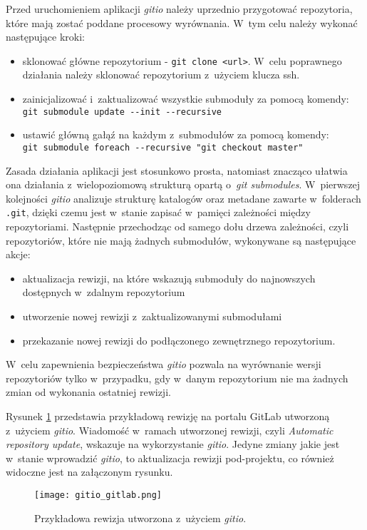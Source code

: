 Przed uruchomieniem aplikacji \emph{gitio} należy uprzednio przygotować repozytoria, które mają zostać poddane procesowy wyrównania. W~tym celu należy wykonać następujące kroki:
\begin{itemize}
    \item sklonować główne repozytorium - \lstinline{git clone <url>}. W~celu poprawnego działania należy sklonować repozytorium z~użyciem klucza ssh.
    \item zainicjalizować i~zaktualizować wszystkie submoduły za pomocą komendy: \\
        \lstinline{git submodule update --init --recursive}
    \item ustawić główną gałąź na każdym z~submodułów za pomocą komendy: \\
        \lstinline{git submodule foreach --recursive "git checkout master"}
\end{itemize}
Zasada działania aplikacji jest stosunkowo prosta, natomiast znacząco ułatwia ona działania z~wielopoziomową strukturą opartą o~\emph{git submodules}. W~pierwszej kolejności \emph{gitio} analizuje strukturę katalogów oraz metadane zawarte w~folderach \lstinline{.git}, dzięki czemu jest w~stanie zapisać w~pamięci zależności między repozytoriami. Następnie przechodząc od samego dołu drzewa zależności, czyli repozytoriów, które nie mają żadnych submodułów, wykonywane są następujące akcje:
\begin{itemize}
    \item aktualizacja rewizji, na które wskazują submoduły do najnowszych dostępnych w~zdalnym repozytorium
    \item utworzenie nowej rewizji z~zaktualizowanymi submodułami
    \item przekazanie nowej rewizji do podłączonego zewnętrznego repozytorium.
\end{itemize}
W~celu zapewnienia bezpieczeństwa \emph{gitio} pozwala na wyrównanie wersji repozytoriów tylko w~przypadku, gdy w~danym repozytorium nie ma żadnych zmian od wykonania ostatniej rewizji. 

Rysunek \ref{fig:gitlab_gitio} przedstawia przykładową rewizję na portalu GitLab utworzoną z~użyciem \emph{gitio}. Wiadomość w~ramach utworzonej rewizji, czyli \emph{Automatic repository update}, wskazuje na wykorzystanie \emph{gitio}. Jedyne zmiany jakie jest w~stanie wprowadzić \emph{gitio}, to aktualizacja rewizji pod-projektu, co również widoczne jest na załączonym rysunku.

\begin{figure}[H]
    \centering
    \texttt{[image: gitio\_gitlab.png]}
    \caption{Przykładowa rewizja utworzona z~użyciem \emph{gitio}.}
    \label{fig:gitlab_gitio}
\end{figure}


